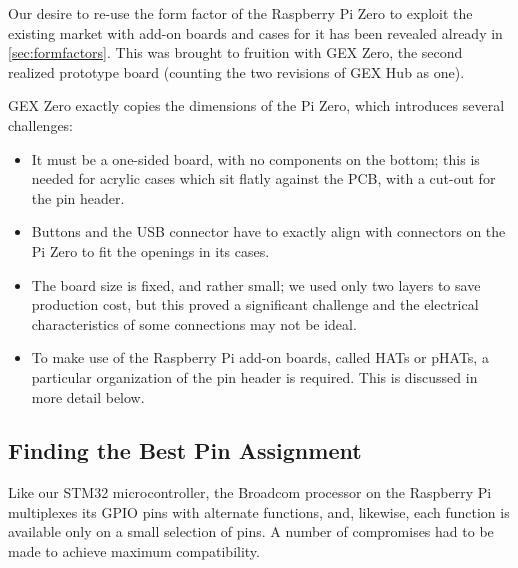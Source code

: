 Our desire to re-use the form factor of the Raspberry Pi Zero to exploit the existing market with add-on boards and cases for it has been revealed already in \cref{sec:formfactors}. This was brought to fruition with GEX Zero, the second realized prototype board (counting the two revisions of GEX Hub as one).

GEX Zero exactly copies the dimensions of the Pi Zero, which introduces several challenges:

\begin{itemize}
	\item It must be a one-sided board, with no components on the bottom; this is needed for acrylic cases which sit flatly against the \gls{PCB}, with a cut-out for the pin header.
	\item Buttons and the USB connector have to exactly align with connectors on the Pi Zero to fit the openings in its cases.
	\item The board size is fixed, and rather small; we used only two layers to save production cost, but this proved a significant challenge and the electrical characteristics of some connections may not be ideal.
	\item To make use of the Raspberry Pi add-on boards, called HATs or pHATs, a particular organization of the pin header is required. This is discussed in more detail below.
\end{itemize}

\subsection{Finding the Best Pin Assignment}

Like our STM32 microcontroller, the Broadcom processor on the Raspberry Pi multiplexes its \gls{GPIO} pins with alternate functions, and, likewise, each function is available only on a small selection of pins. A number of compromises had to be made to achieve maximum compatibility.



